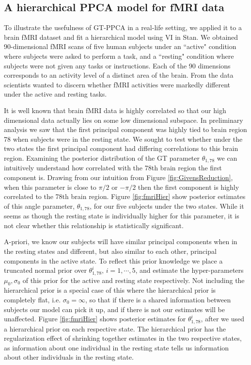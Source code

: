 \documentclass{article}
\begin{document}
\subsection{A hierarchical PPCA model for fMRI data}
To illustrate the usefulness of GT-PPCA in a real-life setting, we applied it to a brain fMRI dataset and fit a hierarchical model using VI in Stan. We obtained 90-dimensional fMRI scans of five human subjects under an ``active" condition where subjects were asked to perform a task, and a ``resting" condition where subjects were not given any tasks or instructions. Each of the 90 dimensions corresponds to an activity level of a distinct area of the brain. From the data scientists wanted to discern whether fMRI activities were markedly different under the active and resting tasks.

It is well known that brain fMRI data is highly correlated so that our high dimensional data actually lies on some low dimensional subspace. In preliminary analysis we saw that the first principal component was highly tied to brain region 78 when subjects were in the resting state. We sought to test whether under the two states the first principal component had differing correlations to this brain region.  Examining the posterior distribution of the GT parameter $\theta_{1,78}$ we can intuitively understand how correlated with the 78th brain region the first component is. Drawing from our intuition from Figure \ref{fig:GivensReduction}, when this parameter is close to $\pi/2$ or $-\pi/2$ then the first component is highly correlated to the 78th brain region. Figure \ref{fig:fmriHier} show posterior estimates of this angle parameter, $\theta_{1,78}$, for our five subjects under the two states. While it seems as though the resting state is individually higher for this parameter, it is not clear whether this relationship is statistically significant.

A-priori, we know our subjects will have similar principal components when in the resting states and different, but also similar to each other, principal components in the active state. To reflect this prior knowledge we place a truncated normal prior over $\theta_{1,78}^{i}, \, i = 1,\cdots, 5$, and estimate the hyper-parameters $\mu_0, \sigma_0$ of this prior for the active and resting state respectively. Not including the hierarchical prior is a special case of this where the hierarchical prior is completely flat, i.e. $\sigma_0 = \infty$, so that if there is a shared information between subjects our model can pick it up, and if there is not our estimates will be unaffected. Figure \ref{fig:fmriHier} shows posterior estimates for $\theta_{1,78}^{i}$, after we used a hierarchical prior on each respective state. The hierarchical prior has the regularization effect of shrinking together estimates in the two respective states, as information about one individual in the resting state tells us information about other individuals in the resting state.
\end{document}
